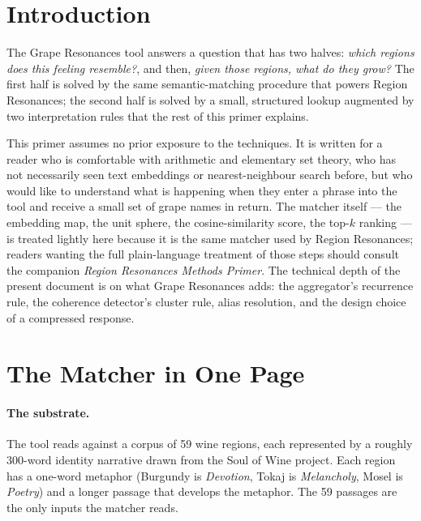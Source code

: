 \documentclass[11pt]{article}
\begin{document}

\section*{Introduction}

The Grape Resonances tool answers a question that has two halves: \emph{which regions does this feeling resemble?}, and then, \emph{given those regions, what do they grow?} The first half is solved by the same semantic-matching procedure that powers Region Resonances; the second half is solved by a small, structured lookup augmented by two interpretation rules that the rest of this primer explains.

This primer assumes no prior exposure to the techniques. It is written for a reader who is comfortable with arithmetic and elementary set theory, who has not necessarily seen text embeddings or nearest-neighbour search before, but who would like to understand what is happening when they enter a phrase into the tool and receive a small set of grape names in return. The matcher itself --- the embedding map, the unit sphere, the cosine-similarity score, the top-$k$ ranking --- is treated lightly here because it is the same matcher used by Region Resonances; readers wanting the full plain-language treatment of those steps should consult the companion \emph{Region Resonances Methods Primer}. The technical depth of the present document is on what Grape Resonances adds: the aggregator's recurrence rule, the coherence detector's cluster rule, alias resolution, and the design choice of a compressed response.

\section{The Matcher in One Page}

\paragraph{The substrate.}
The tool reads against a corpus of 59 wine regions, each represented by a roughly 300-word identity narrative drawn from the Soul of Wine project. Each region has a one-word metaphor (Burgundy is \emph{Devotion}, Tokaj is \emph{Melancholy}, Mosel is \emph{Poetry}) and a longer passage that develops the metaphor. The 59 passages are the only inputs the matcher reads.
\end{document}
